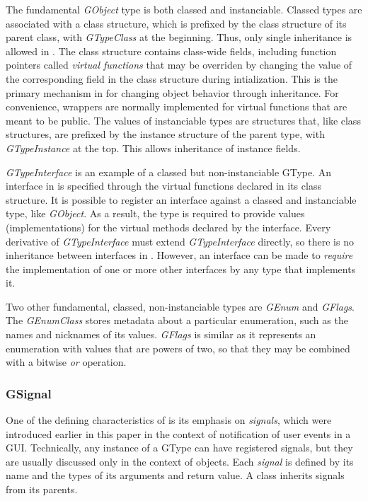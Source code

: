 \documentclass[article]{jss}
\begin{document}
The fundamental \emph{GObject} type is both classed and instanciable. Classed 
types are associated with a class structure, which is prefixed by the class structure 
of its parent class, with \emph{GTypeClass} at the beginning. Thus, only single
inheritance is allowed in .
The class structure contains class-wide fields, including function pointers
called \emph{virtual functions} that may be overriden by changing
the value of the corresponding field in the class structure during intialization.
This is the primary mechanism in  for changing object behavior through
inheritance. For convenience, wrappers are normally implemented for virtual
functions that are meant to be public. The values of instanciable types are 
structures that, like class structures, are prefixed by the instance structure
of the parent type, with \emph{GTypeInstance} at the top. 
This allows inheritance of instance fields. 

\emph{GTypeInterface} is an example of a classed but non-instanciable GType.
An interface in  is specified through the
virtual functions declared in its class structure. It is possible to register 
an interface against a classed and instanciable type, like \emph{GObject}. As
a result, the type is required to provide values (implementations) for the 
virtual methods declared by the interface.
Every derivative of \emph{GTypeInterface} must extend \emph{GTypeInterface} directly, 
so there is no inheritance between interfaces in . However, an 
interface can be made to \emph{require} the implementation of one or more other 
interfaces by any type that implements it.

Two other fundamental, classed, non-instanciable types are \emph{GEnum} and 
\emph{GFlags}. The \emph{GEnumClass} stores metadata about a particular
enumeration, such as the names and nicknames of its values. \emph{GFlags} is
similar as it represents an enumeration with values that are powers of two, 
so that they may be combined with a bitwise \emph{or} operation.

\subsubsection{GSignal}

One of the defining characteristics of  is its emphasis on
\emph{signals}, which were introduced earlier in this paper in the context of
notification of user events in a  GUI. Technically,
any instance of a GType can have registered signals, but they are usually 
discussed only in the context of objects. Each \emph{signal} is defined
by its name and the types of its arguments and return value. A class inherits
signals from its parents.
\end{document}

